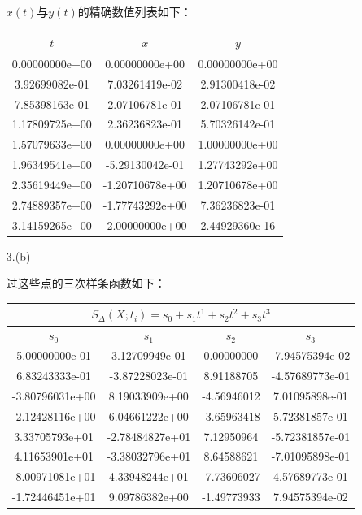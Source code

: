 \documentclass[a4paper]{book}
\begin{document}
\begin{enumerate}
$x(t)$与$y(t)$的精确数值列表如下：

\begin{table}[ht!]
    \begin{center}
    \begin{tabular}{|ccc|}
        \hline
        $t$ & $x$ & $y$ \\
        \hline
        0.00000000e+00 &  0.00000000e+00 & 0.00000000e+00 \\
        3.92699082e-01 &  7.03261419e-02 & 2.91300418e-02 \\
        7.85398163e-01 &  2.07106781e-01 & 2.07106781e-01 \\
        1.17809725e+00 &  2.36236823e-01 & 5.70326142e-01 \\
        1.57079633e+00 &  0.00000000e+00 & 1.00000000e+00 \\
        1.96349541e+00 & -5.29130042e-01 & 1.27743292e+00 \\
        2.35619449e+00 & -1.20710678e+00 & 1.20710678e+00 \\
        2.74889357e+00 & -1.77743292e+00 & 7.36236823e-01 \\
        3.14159265e+00 & -2.00000000e+00 & 2.44929360e-16 \\
        \hline
    \end{tabular}
\end{center}
\end{table}

\item[3.(b)]

过这些点的三次样条函数如下：

\begin{table}[ht!]
    \begin{center}
    \begin{tabular}{|cccc|}
        \hline
        \multicolumn{4}{|c|}{$S_\Delta(X;t_i)=s_0+s_1 t^1+s_2 t^2+s_3 t^3$} \\
        \hline
        $s_0$ & $s_1$ & $s_2$ & $s_3$ \\
        \hline
        5.00000000e-01 &  3.12709949e-01 &  0.00000000 & -7.94575394e-02 \\
        6.83243333e-01 & -3.87228023e-01 &  8.91188705 & -4.57689773e-01 \\
       -3.80796031e+00 &  8.19033909e+00 & -4.56946012 &  7.01095898e-01 \\
       -2.12428116e+00 &  6.04661222e+00 & -3.65963418 &  5.72381857e-01 \\
        3.33705793e+01 & -2.78484827e+01 &  7.12950964 & -5.72381857e-01 \\
        4.11653901e+01 & -3.38032796e+01 &  8.64588621 & -7.01095898e-01 \\
       -8.00971081e+01 &  4.33948244e+01 & -7.73606027 &  4.57689773e-01 \\
       -1.72446451e+01 &  9.09786382e+00 & -1.49773933 &  7.94575394e-02 \\
        \hline
    \end{tabular}
\end{center}
\end{table}


\end{enumerate}
\end{document}
